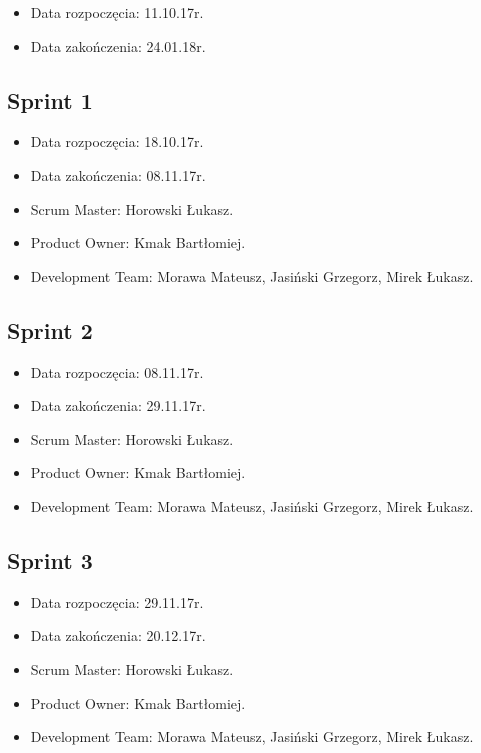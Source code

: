\documentclass[a4paper]{article}
\begin{document}
\begin{itemize}
\item Data rozpoczęcia: 11.10.17r.
\item  Data zakończenia: 24.01.18r.
\end{itemize}

\subsection{Sprint 1}

\begin{itemize}
\item Data rozpoczęcia: 18.10.17r.
\item Data zakończenia: 08.11.17r.
\item Scrum Master: Horowski Łukasz.
\item Product Owner: Kmak Bartłomiej.
\item Development Team: Morawa Mateusz, Jasiński Grzegorz, Mirek Łukasz.
\end{itemize}

\subsection{Sprint 2}

\begin{itemize}
\item Data rozpoczęcia: 08.11.17r.
\item  Data zakończenia: 29.11.17r.
\item Scrum Master: Horowski Łukasz.
\item Product Owner: Kmak Bartłomiej.
\item Development Team: Morawa Mateusz, Jasiński Grzegorz, Mirek Łukasz.
\end{itemize}

\subsection{Sprint 3}

\begin{itemize}
\item Data rozpoczęcia: 29.11.17r.
\item  Data zakończenia: 20.12.17r.
\item Scrum Master: Horowski Łukasz.
\item Product Owner: Kmak Bartłomiej.
\item Development Team: Morawa Mateusz, Jasiński Grzegorz, Mirek Łukasz.
\end{itemize}
\end{document}

